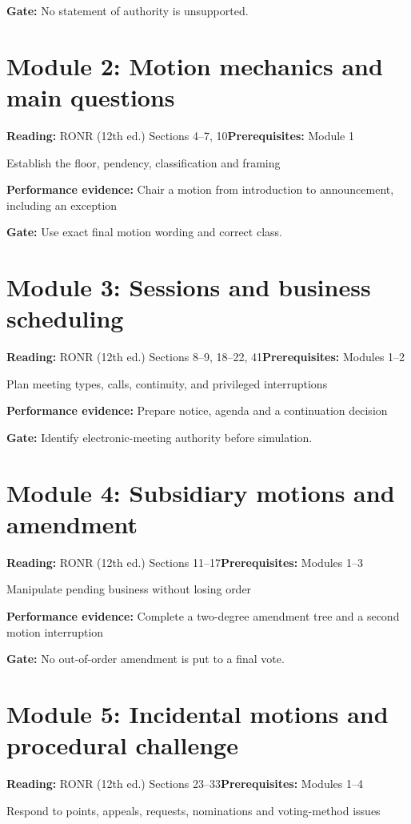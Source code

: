 \documentclass[11pt]{article}
\begin{document}
\textbf{Gate:} No statement of authority is unsupported.

\section{Module 2: Motion mechanics and main questions}
\textbf{Reading:} RONR (12th ed.) Sections 4--7, 10\quad\textbf{Prerequisites:} Module 1

Establish the floor, pendency, classification and framing

\textbf{Performance evidence:} Chair a motion from introduction to announcement, including an exception

\textbf{Gate:} Use exact final motion wording and correct class.

\section{Module 3: Sessions and business scheduling}
\textbf{Reading:} RONR (12th ed.) Sections 8--9, 18--22, 41\quad\textbf{Prerequisites:} Modules 1--2

Plan meeting types, calls, continuity, and privileged interruptions

\textbf{Performance evidence:} Prepare notice, agenda and a continuation decision

\textbf{Gate:} Identify electronic-meeting authority before simulation.

\section{Module 4: Subsidiary motions and amendment}
\textbf{Reading:} RONR (12th ed.) Sections 11--17\quad\textbf{Prerequisites:} Modules 1--3

Manipulate pending business without losing order

\textbf{Performance evidence:} Complete a two-degree amendment tree and a second motion interruption

\textbf{Gate:} No out-of-order amendment is put to a final vote.

\section{Module 5: Incidental motions and procedural challenge}
\textbf{Reading:} RONR (12th ed.) Sections 23--33\quad\textbf{Prerequisites:} Modules 1--4

Respond to points, appeals, requests, nominations and voting-method issues
\end{document}
